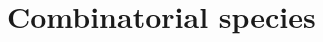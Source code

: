 \documentclass[12pt, reqno]{amsart}
\theoremstyle{definition}
\newcommand{\oPi}{\mathbf{C}}
\newcommand{\opi}{\vec{\boldsymbol{\pi}}}
\begin{document}
%
%
%
%
%
%
%
%
%
%
%



\

\section{Combinatorial species\label{sec:species}}
\end{document}
